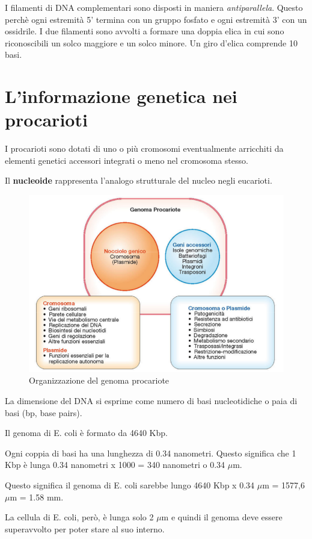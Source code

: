 \documentclass[11pt]{book}
\begin{document}
I filamenti di DNA complementari sono disposti in maniera \emph{antiparallela}.
Questo perchè ogni estremità 5’ termina con un gruppo fosfato e ogni estremità 3’ con un ossidrile. I due filamenti sono avvolti a formare una doppia elica in cui sono riconoscibili un solco maggiore e un solco minore. Un giro d’elica comprende 10 basi.

\section{L'informazione genetica nei procarioti}
I procarioti sono dotati di uno o più cromosomi eventualmente arricchiti da elementi genetici accessori integrati o meno nel cromosoma stesso. 

Il \textbf{nucleoide} rappresenta l'analogo strutturale del nucleo negli eucarioti.


\begin{figure}[htp]
\centering
\includegraphics[scale=0.4]{img/Il genoma procariote.png}
\caption{Organizzazione del genoma procariote}
\label{}
\end{figure}

La dimensione del DNA si esprime come numero di basi nucleotidiche o paia di basi (bp, base pairs).

Il genoma di E. coli è formato da 4640 Kbp.
 
Ogni coppia di basi ha una lunghezza di 0.34 nanometri. Questo significa che 1 Kbp è lunga 0.34 nanometri x 1000 = 340 nanometri o 0.34 $\mu$m.

Questo significa il genoma di E. coli sarebbe lungo 4640 Kbp x 0.34 $\mu$m = 1577,6 $\mu$m = 1.58 mm.

La cellula di E. coli, però, è lunga solo 2 $\mu$m e quindi il genoma deve essere superavvolto per poter stare al suo interno.
\end{document}
